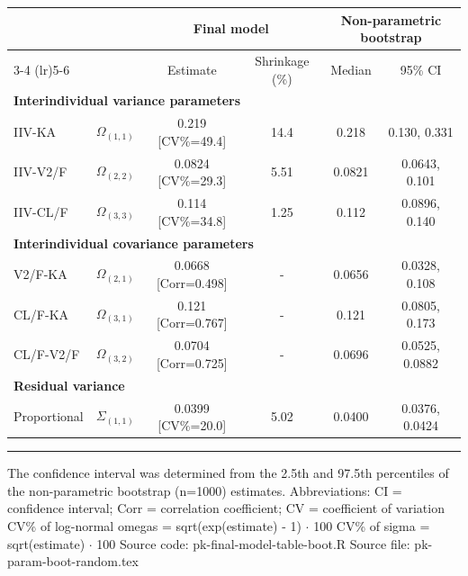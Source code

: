 \setlength{\tabcolsep}{5pt} 
\begin{threeparttable}
\renewcommand{\arraystretch}{1.3}
\begin{tabular}[h]{lccccc}
\hline
\multicolumn{2}{c}{} & \multicolumn{2}{c}{Final model} & \multicolumn{2}{c}{Non-parametric bootstrap} \\
\cmidrule(lr){3-4}
\cmidrule(lr){5-6}
 &  & Estimate & Shrinkage (\%) & Median & 95\% CI \\
\hline
\multicolumn{6}{l}{\textbf{Interindividual variance parameters}}\\%
IIV-KA & $\Omega_{(1,1)}$ & 0.219 [CV\%=49.4] & 14.4 & 0.218 & 0.130, 0.331 \\
IIV-V2/F & $\Omega_{(2,2)}$ & 0.0824 [CV\%=29.3] & 5.51 & 0.0821 & 0.0643, 0.101 \\
IIV-CL/F & $\Omega_{(3,3)}$ & 0.114 [CV\%=34.8] & 1.25 & 0.112 & 0.0896, 0.140 \\
\hline \multicolumn{6}{l}{\textbf{Interindividual covariance parameters}}\\%
V2/F-KA & $\Omega_{(2,1)}$ & 0.0668 [Corr=0.498] & - & 0.0656 & 0.0328, 0.108 \\
CL/F-KA & $\Omega_{(3,1)}$ & 0.121 [Corr=0.767] & - & 0.121 & 0.0805, 0.173 \\
CL/F-V2/F & $\Omega_{(3,2)}$ & 0.0704 [Corr=0.725] & - & 0.0696 & 0.0525, 0.0882 \\
\hline \multicolumn{6}{l}{\textbf{Residual variance}}\\%
Proportional & $\Sigma_{(1,1)}$ & 0.0399 [CV\%=20.0] & 5.02 & 0.0400 & 0.0376, 0.0424 \\
\hline
\end{tabular}
\end{threeparttable}
 
\vspace{0.67cm}
 
\begin{minipage}{1\linewidth}
\linespread{1.1}\selectfont
\rule{1\linewidth}{0.4pt}
\vspace{0.02cm}
The confidence interval was determined from the 
2.5th and 97.5th percentiles of the non-parametric 
bootstrap (n=1000) estimates. \newline
Abbreviations: CI = confidence interval; 
                        Corr = correlation coefficient;
                        CV = coefficient of variation \newline
CV\% of log-normal omegas = sqrt(exp(estimate) - 1) $\cdot$ 100 \newline
CV\% of sigma = sqrt(estimate) $\cdot$ 100 \newline
Source code: pk-final-model-table-boot.R \newline
Source file: pk-param-boot-random.tex \newline
\end{minipage}
